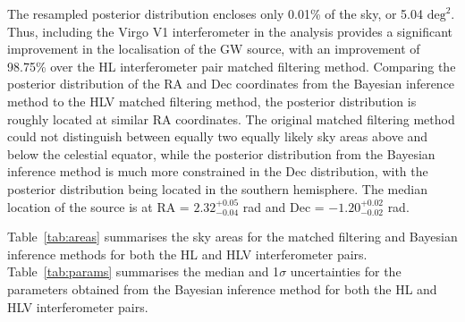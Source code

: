 \documentclass[11pt,a4paper]{article}
\begin{document}
The resampled posterior distribution encloses only 0.01\% of the sky, or 5.04 $\mathrm{deg}^2$. Thus, including the Virgo V1 interferometer in the analysis provides a significant improvement in the localisation of the GW source, with an improvement of 98.75\% over the HL interferometer pair matched filtering method. Comparing the posterior distribution of the RA and Dec coordinates from the Bayesian inference method to the HLV matched filtering method, the posterior distribution is roughly located at similar RA coordinates. The original matched filtering method could not distinguish between equally two equally likely sky areas above and below the celestial equator, while the posterior distribution from the Bayesian inference method is much more constrained in the Dec distribution, with the posterior distribution being located in the southern hemisphere. The median location of the source is at RA = $2.32^{+0.05}_{-0.04}$ rad and Dec = $-1.20^{+0.02}_{-0.02}$ rad.

Table~\ref{tab:areas} summarises the sky areas for the matched filtering and Bayesian inference methods for both the HL and HLV interferometer pairs. Table~\ref{tab:params} summarises the median and 1$\sigma$ uncertainties for the parameters obtained from the Bayesian inference method for both the HL and HLV interferometer pairs.
\end{document}
